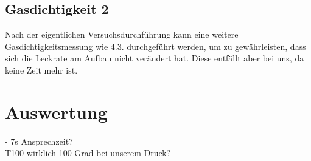 \documentclass[]{article}
\begin{document}
	\subsection{Gasdichtigkeit 2}
	
	Nach der eigentlichen Versuchsdurchführung kann eine weitere Gasdichtigkeitsmessung wie 4.3. durchgeführt werden, um zu gewährleisten, dass sich die Leckrate am Aufbau nicht verändert hat. Diese entfällt aber bei uns, da keine Zeit mehr ist.
	
	\section{Auswertung}
	{\color{red}- 7s Ansprechzeit?}\\
	{\color{red}T100 wirklich 100 Grad bei unserem Druck?}\\
\end{document}
